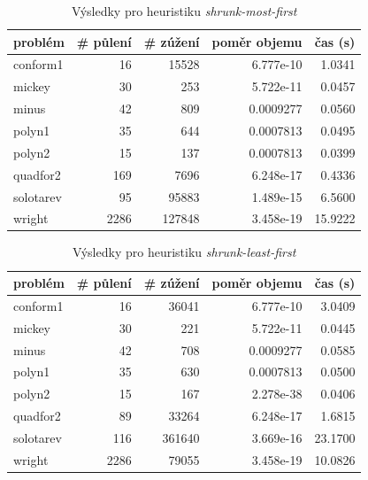 {\begin{table}[H]
\centering
\begin{tabular}{lrrrr}
\hline
problém & \# půlení & \# zúžení & poměr objemu & čas (s) \\ \hline
conform1 & 16 & 15528 & 6.777e-10 & 1.0341 \\
mickey & 30 & 253 & 5.722e-11 & 0.0457 \\
minus & 42 & 809 & 0.0009277 & 0.0560 \\
polyn1 & 35 & 644 & 0.0007813 & 0.0495 \\
polyn2 & 15 & 137 & 0.0007813 & 0.0399 \\
quadfor2 & 169 & 7696 & 6.248e-17 & 0.4336 \\
solotarev & 95 & 95883 & 1.489e-15 & 6.5600 \\
wright & 2286 & 127848 & 3.458e-19 & 15.9222 \\
\end{tabular}
\caption{Výsledky pro heuristiku \emph{shrunk-most-first}}
\label{shrunk-most-first}
\end{table}



\begin{table}[H]
\centering
\begin{tabular}{lrrrr}
\hline
problém & \# půlení & \# zúžení & poměr objemu & čas (s) \\ \hline
conform1 & 16 & 36041 & 6.777e-10 & 3.0409 \\
mickey & 30 & 221 & 5.722e-11 & 0.0445 \\
minus & 42 & 708 & 0.0009277 & 0.0585 \\
polyn1 & 35 & 630 & 0.0007813 & 0.0500 \\
polyn2 & 15 & 167 & 2.278e-38 & 0.0406 \\
quadfor2 & 89 & 33264 & 6.248e-17 & 1.6815 \\
solotarev & 116 & 361640 & 3.669e-16 & 23.1700 \\
wright & 2286 & 79055 & 3.458e-19 & 10.0826 \\
\end{tabular}
\caption{Výsledky pro heuristiku \emph{shrunk-least-first}}
\label{shrunk-least-first}
\end{table}



}
